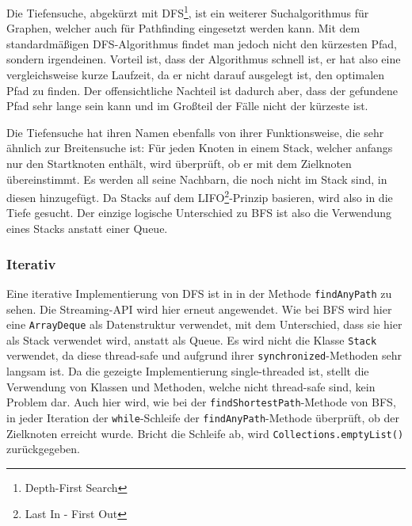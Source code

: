             Die Tiefensuche, abgekürzt mit DFS\footnote{Depth-First Search}, ist ein weiterer Suchalgorithmus für Graphen, welcher auch für Pathfinding eingesetzt werden kann. Mit dem standardmäßigen DFS-Algorithmus findet man jedoch nicht den kürzesten Pfad, sondern irgendeinen. Vorteil ist, dass der Algorithmus schnell ist, er hat also eine vergleichsweise kurze Laufzeit, da er nicht darauf ausgelegt ist, den optimalen Pfad zu finden. Der offensichtliche Nachteil ist dadurch aber, dass der gefundene Pfad sehr lange sein kann und im Großteil der Fälle nicht der kürzeste ist.
            
            Die Tiefensuche hat ihren Namen ebenfalls von ihrer Funktionsweise, die sehr ähnlich zur Breitensuche ist: Für jeden Knoten in einem Stack, welcher anfangs nur den Startknoten enthält, wird überprüft, ob er mit dem Zielknoten übereinstimmt. Es werden all seine Nachbarn, die noch nicht im Stack sind, in diesen hinzugefügt. Da Stacks auf dem LIFO\footnote{Last In - First Out}-Prinzip basieren, wird also in die Tiefe gesucht. Der einzige logische Unterschied zu BFS ist also die Verwendung eines Stacks anstatt einer Queue.

            \subsubsection{Iterativ}
            
                Eine iterative Implementierung von DFS ist in  in der Methode \lstinline{findAnyPath} zu sehen. Die Streaming-API wird hier erneut angewendet. Wie bei BFS wird hier eine \lstinline{ArrayDeque} als Datenstruktur verwendet, mit dem Unterschied, dass sie hier als Stack verwendet wird, anstatt als Queue. Es wird nicht die Klasse \lstinline{Stack} verwendet, da diese thread-safe und aufgrund ihrer \lstinline{synchronized}-Methoden sehr langsam ist. Da die gezeigte Implementierung single-threaded ist, stellt die Verwendung von Klassen und Methoden, welche nicht thread-safe sind, kein Problem dar. Auch hier wird, wie bei der \lstinline{findShortestPath}-Methode von BFS, in jeder Iteration der \lstinline{while}-Schleife der \lstinline{findAnyPath}-Methode überprüft, ob der Zielknoten erreicht wurde. Bricht die Schleife ab, wird \lstinline{Collections.emptyList()} zurückgegeben.
                
